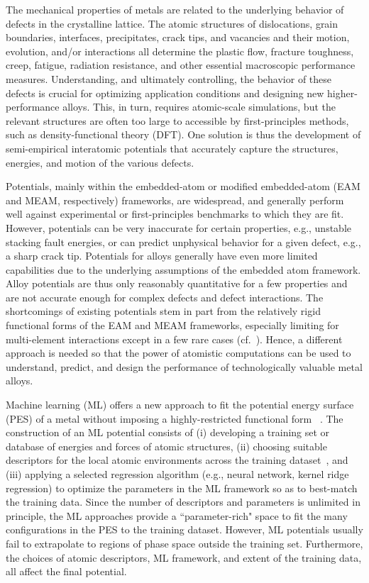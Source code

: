 \documentclass{article}
\begin{document}
The mechanical properties of metals are related to the underlying behavior of defects in the crystalline lattice. The atomic structures of dislocations, grain boundaries, interfaces, precipitates, crack tips, and vacancies and their motion, evolution, and/or interactions all determine the plastic flow, fracture toughness, creep, fatigue, radiation resistance, and other essential macroscopic performance measures.   Understanding, and ultimately controlling, the behavior of these defects is crucial for optimizing application conditions and designing new higher-performance alloys.  This, in turn, requires atomic-scale simulations, but the relevant structures are often too large to accessible by first-principles methods, such as density-functional theory (DFT). One solution is thus the development of semi-empirical interatomic potentials that accurately capture the structures, energies, and motion of the various defects.

Potentials, mainly within the embedded-atom or modified embedded-atom (EAM and MEAM, respectively) frameworks, are widespread, and generally perform well against experimental or first-principles benchmarks to which they are fit.
However, potentials can be very inaccurate for certain properties, e.g., unstable stacking fault energies, or can predict unphysical behavior for a given defect, e.g., a sharp crack tip.
Potentials for alloys generally have even more limited capabilities due to the underlying assumptions of the embedded atom framework.  Alloy potentials are thus only reasonably quantitative for a few properties and are not accurate enough for complex defects and defect interactions.
The shortcomings of existing potentials stem in part from the relatively rigid functional forms of the EAM and MEAM frameworks, especially limiting for multi-element interactions except in a few rare cases (cf.~\cite{Juslin2005AnalyticalSystem}).
Hence, a different approach is needed so that the power of atomistic computations can be used to understand, predict, and design the performance of technologically valuable metal alloys.

Machine learning (ML) offers a new approach to fit the potential energy surface (PES)
of a metal without imposing a highly-restricted functional form ~\cite{Bartok2013,Behler2015,Kobayashi2017,PurjaPun0PhysicallyMaterials,Wang2018}.
The construction of an ML potential consists of (i) developing a training set or database of energies and forces of atomic structures, (ii) choosing suitable descriptors for the local atomic environments across the training dataset~\cite{Behler2007,Rogers2010Extended-connectivityFingerprints,Bartok2015,Faber2017PredictionError}, and (iii) applying a selected regression algorithm (e.g., neural network, kernel ridge regression) to optimize the parameters in the ML framework so as to best-match the training data.
Since the number of descriptors and parameters is unlimited in principle, the ML approaches provide a ``parameter-rich" space to fit the many configurations in the PES to the training dataset.
However, ML potentials usually fail to extrapolate to regions of phase space outside the training set. Furthermore, the choices of atomic descriptors, ML framework, and extent of the training data, all affect the final potential.
\end{document}
